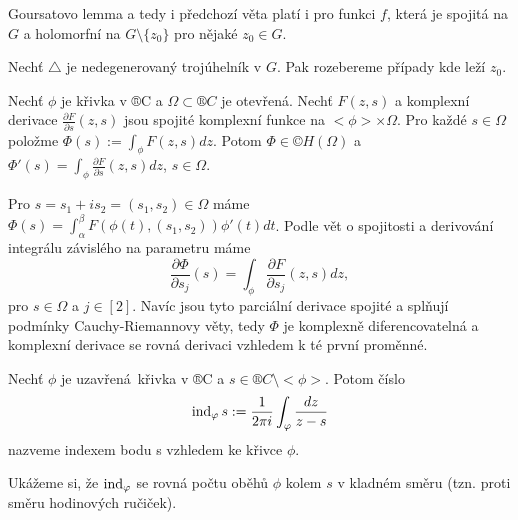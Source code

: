 \documentclass[12pt]{article}					%
\begin{document}
\begin{poznamka}
	Goursatovo lemma a tedy i předchozí věta platí i pro funkci $f$, která je spojitá na $G$ a holomorfní na $G \setminus \{z_0\}$ pro nějaké $z_0 \in G$.

	\begin{dukazin}
		Nechť $\triangle$ je nedegenerovaný trojúhelník v $G$. Pak rozebereme případy kde leží $z_0$.
	\end{dukazin}
\end{poznamka}

\begin{veta}
	Nechť $\phi$ je křivka v ®C a $\Omega \subset ®C$ je otevřená. Nechť $F(z, s)$ a komplexní derivace $\frac{\partial F}{\partial s}(z, s)$ jsou spojité komplexní funkce na $<\phi> \times \Omega$. Pro každé $s \in \Omega$ položme $\Phi(s) := \int_\phi F(z, s) dz$. Potom $\Phi \in ©H(\Omega)$ a $\Phi'(s) = \int_\phi \frac{\partial F}{\partial s}(z, s) dz$, $s \in \Omega$.

	\begin{dukazin}
		Pro $s = s_1 + i s_2 = (s_1, s_2) \in \Omega$ máme $\Phi(s) = \int_\alpha^\beta F(\phi(t), (s_1, s_2)) \phi'(t)dt$. Podle vět o spojitosti a derivování integrálu závislého na parametru máme
		$$ \frac{\partial \Phi}{\partial s_j}(s) = \int_\phi \frac{\partial F}{\partial s_j}(z, s) dz, $$
		pro $s \in \Omega$ a $j \in [2]$. Navíc jsou tyto parciální derivace spojité a splňují podmínky Cauchy-Riemannovy věty, tedy $\Phi$ je komplexně diferencovatelná a komplexní derivace se rovná derivaci vzhledem k té první proměnné.
	\end{dukazin}
\end{veta}

\begin{definice}
	Nechť $\phi$ je uzavřená křivka v ®C a $s \in ®C \setminus <\phi>$. Potom číslo
	$$ \operatorname{ind}_\varphi s := \frac{1}{2\pi i} \int_\varphi \frac{dz}{z - s} $$
	nazveme indexem bodu s vzhledem ke křivce $\phi$.
\end{definice}

\begin{poznamka}
	Ukážeme si, že $\operatorname{ind}_\varphi$ se rovná počtu oběhů $\phi$ kolem $s$ v kladném směru (tzn. proti směru hodinových ručiček).
\end{poznamka}
\end{document}
